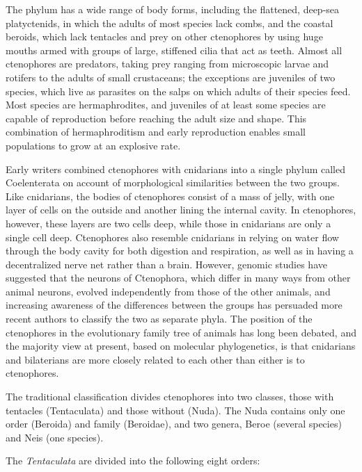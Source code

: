 \documentclass[]{book}
\theoremstyle{definition}
\theoremstyle{definition}
\theoremstyle{definition}
\theoremstyle{remark}
\begin{document}
The phylum has a wide range of body forms, including the flattened,
deep-sea platyctenids, in which the adults of most species lack combs,
and the coastal beroids, which lack tentacles and prey on other
ctenophores by using huge mouths armed with groups of large, stiffened
cilia that act as teeth. Almost all ctenophores are predators, taking
prey ranging from microscopic larvae and rotifers to the adults of small
crustaceans; the exceptions are juveniles of two species, which live as
parasites on the salps on which adults of their species feed. Most
species are hermaphrodites, and juveniles of at least some species are
capable of reproduction before reaching the adult size and shape. This
combination of hermaphroditism and early reproduction enables small
populations to grow at an explosive rate.

Early writers combined ctenophores with cnidarians into a single phylum
called Coelenterata on account of morphological similarities between the
two groups. Like cnidarians, the bodies of ctenophores consist of a mass
of jelly, with one layer of cells on the outside and another lining the
internal cavity. In ctenophores, however, these layers are two cells
deep, while those in cnidarians are only a single cell deep. Ctenophores
also resemble cnidarians in relying on water flow through the body
cavity for both digestion and respiration, as well as in having a
decentralized nerve net rather than a brain. However, genomic studies
have suggested that the neurons of Ctenophora, which differ in many ways
from other animal neurons, evolved independently from those of the other
animals, and increasing awareness of the differences between the groups
has persuaded more recent authors to classify the two as separate phyla.
The position of the ctenophores in the evolutionary family tree of
animals has long been debated, and the majority view at present, based
on molecular phylogenetics, is that cnidarians and bilaterians are more
closely related to each other than either is to ctenophores.

The traditional classification divides ctenophores into two classes,
those with tentacles (Tentaculata) and those without (Nuda). The Nuda
contains only one order (Beroida) and family (Beroidae), and two genera,
Beroe (several species) and Neis (one species).

The \emph{Tentaculata} are divided into the following eight orders:
\end{document}
